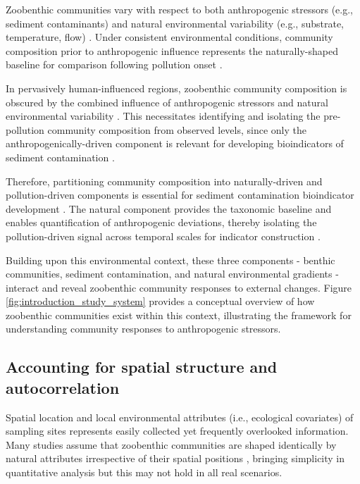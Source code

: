Zoobenthic communities vary with respect to both anthropogenic stressors (e.g., sediment contaminants) 
and natural environmental variability (e.g., substrate, temperature, flow) \cite{PasanenMortensen2013FoxLynx}.
Under consistent environmental conditions, community composition prior to anthropogenic influence 
represents the naturally-shaped baseline for comparison following pollution onset \cite{Reynoldson1997ReferenceCondition}.

In pervasively human-influenced regions, zoobenthic community composition is obscured by the combined influence of
anthropogenic stressors and natural environmental variability \cite{Stoddard2006}.
This necessitates identifying and isolating the pre-pollution community composition from observed levels,
since only the anthropogenically-driven component is relevant for developing
bioindicators of sediment contamination \cite{Reynoldson1997ReferenceCondition}.

Therefore, partitioning community composition into naturally-driven and pollution-driven components 
is essential for sediment contamination bioindicator development \cite{Reynoldson1997ReferenceCondition}.
The natural component provides the taxonomic baseline and enables quantification of anthropogenic deviations,
thereby isolating the pollution-driven signal across temporal scales
for indicator construction \cite{Legendre2008VariationPartitioning}.

Building upon this environmental context, these three components - 
benthic communities, sediment contamination, and natural environmental gradients 
- interact and reveal zoobenthic community responses to external changes.
Figure \textcolor{blue}{\ref{fig:introduction_study_system}} provides a conceptual overview 
of how zoobenthic communities exist within this context,
illustrating the framework for understanding community responses to anthropogenic stressors.


\subsection{Accounting for spatial structure and autocorrelation}
Spatial location and local environmental attributes (i.e., ecological covariates) of sampling sites represents easily collected yet frequently overlooked information.
Many studies assume that zoobenthic communities are shaped identically by natural attributes
irrespective of their spatial positions \cite{Borcard1992SpatialPartialling},
bringing simplicity in quantitative analysis but this may not hold in all real scenarios.

